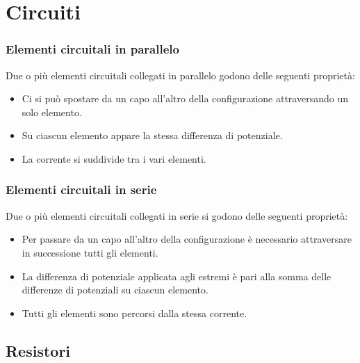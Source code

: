 \chapter{Circuiti}
\subsection*{Elementi circuitali in parallelo}
Due o più elementi circuitali collegati in parallelo godono delle seguenti proprietà:
\begin{itemize}
\item{Ci si può spostare da un capo all'altro della configurazione attraversando un solo elemento.}
\item{Su ciascun elemento appare la stessa differenza di potenziale.}
\item{La corrente si suddivide tra i vari elementi.}
\end{itemize}

\subsection*{Elementi circuitali in serie}
Due o più elementi circuitali collegati in serie si godono delle seguenti proprietà:
\begin{itemize}
\item{Per passare da un capo all'altro della configurazione è necessario attraversare in successione tutti gli elementi.}
\item{La differenza di potenziale applicata agli estremi è pari alla somma delle differenze di potenziali su ciascun elemento.}
\item{Tutti gli elementi sono percorsi dalla stessa corrente.}
\end{itemize}

\section{Resistori}

